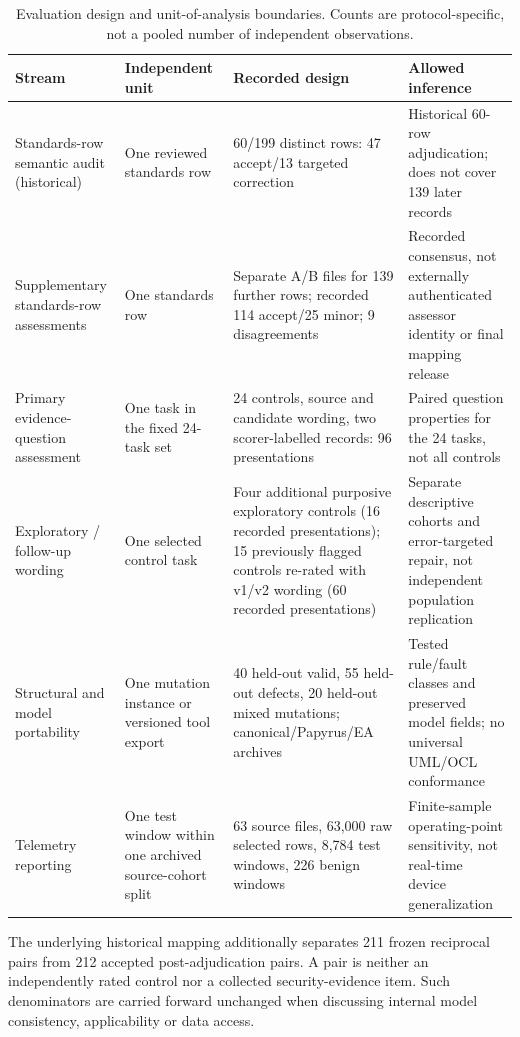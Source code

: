 \documentclass[12pt,a4paper]{article}
\begin{document}
\begin{table}[!htbp]
\centering\small\setlength{\tabcolsep}{3.4pt}
\caption{Evaluation design and unit-of-analysis boundaries. Counts are protocol-specific, not a pooled number of independent observations.}\label{tab:stage8-design}
\begin{tabularx}{\textwidth}{@{}p{}p{}p{}X@{}}\toprule
\textbf{Stream} & \textbf{Independent unit} & \textbf{Recorded design} & \textbf{Allowed inference}\\\midrule
Standards-row semantic audit (historical) & One reviewed standards row & 60/199 distinct rows: 47 accept/13 targeted correction & Historical 60-row adjudication; does not cover 139 later records\\
Supplementary standards-row assessments & One standards row & Separate A/B files for 139 further rows; recorded 114 accept/25 minor; 9 disagreements & Recorded consensus, not externally authenticated assessor identity or final mapping release\\
Primary evidence-question assessment & One task in the fixed 24-task set & 24 controls, source and candidate wording, two scorer-labelled records: 96 presentations & Paired question properties for the 24 tasks, not all controls\\
Exploratory / follow-up wording & One selected control task & Four additional purposive exploratory controls (16 recorded presentations); 15 previously flagged controls re-rated with v1/v2 wording (60 recorded presentations) & Separate descriptive cohorts and error-targeted repair, not independent population replication\\
Structural and model portability & One mutation instance or versioned tool export & 40 held-out valid, 55 held-out defects, 20 held-out mixed mutations; canonical/Papyrus/EA archives & Tested rule/fault classes and preserved model fields; no universal UML/OCL conformance\\
Telemetry reporting & One test window within one archived source-cohort split & 63 source files, 63,000 raw selected rows, 8,784 test windows, 226 benign windows & Finite-sample operating-point sensitivity, not real-time device generalization\\\bottomrule
\end{tabularx}
\end{table}
The underlying historical mapping additionally separates 211 frozen reciprocal pairs from 212 accepted post-adjudication pairs. A pair is neither an independently rated control nor a collected security-evidence item. Such denominators are carried forward unchanged when discussing internal model consistency, applicability or data access.\par
\end{document}
